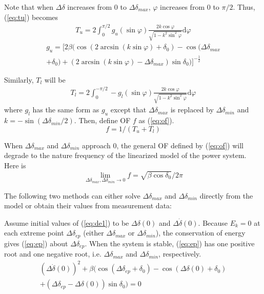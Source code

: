 \documentclass[journal]{IEEEtran}
\begin{document}
Note that when $\Delta\delta$ increases from 0 to $\Delta\delta_{max}$, $\varphi$ increases from 0 to $\pi/2$. Thus, (\ref{eq:tu}) becomes
\begin{eqnarray} \label{eq:tu2}
T_{u}=2\int_{0}^{\pi/2}g_{u}(\sin\varphi)\frac{2k\cos\varphi}{\sqrt{1-k^{2}\sin^{2}\varphi}}\textrm{d}\varphi
\end{eqnarray}
\begin{eqnarray} \label{eq:gu}
g_{u}=\bigl[2\beta\bigl(\cos(2\arcsin(k\sin\varphi)+\delta_{0})-\cos(\Delta\delta_{max}\nonumber\\
+\delta_{0})+(2\arcsin(k\sin\varphi)-\Delta\delta_{max})\sin\delta_{0}\bigl)\bigr]^{-\frac{1}{2}}
\end{eqnarray}

Similarly, $T_{l}$ will be
\begin{eqnarray} \label{eq:tl}
T_{l}=2\int_{0}^{-\pi/2}-g_{l}(\sin\varphi)\frac{2k\cos\varphi}{\sqrt{1-k^{2}\sin^{2}\varphi}}\textrm{d}\varphi
\end{eqnarray}
where $g_{l}$ has the same form as $g_{u}$ except that $\Delta\delta_{max}$ is replaced by $\Delta\delta_{min}$ and $k=-\sin(\Delta\delta_{min}/2)$. Then, define OF $f$ as (\ref{eq:of}).
\begin{equation} \label{eq:of}
f=1/(T_{u}+T_{l})
\end{equation}

When $\Delta\delta_{max}$ and $\Delta\delta_{min}$ approach 0, the general OF defined by (\ref{eq:of}) will degrade to the nature frequency of the linearized model of the power system. Here is
\begin{equation} \label{eq:lmtf}
\lim_{\Delta\delta_{max},\Delta\delta_{min} \to 0}f=\sqrt{\beta\cos \delta_{0}}/2\pi
\end{equation}

The following two methods can either solve $\Delta\delta_{max}$ and $\Delta\delta_{min}$ directly from the model or obtain their values from measurement data:

Assume initial values of (\ref{eq:de1}) to be $\Delta\delta(0)$ and $\Delta\dot{\delta}(0)$. Because $E_{k}=0$ at each extreme point $\Delta\delta_{ep}$ (either $\Delta\delta_{max}$ or $\Delta\delta_{min}$), the conservation of energy gives (\ref{eq:ep}) about $\Delta\delta_{ep}$. When the system is stable, (\ref{eq:ep}) has one positive root and one negative root, i.e. $\Delta\delta_{max}$ and $\Delta\delta_{min}$, respectively.
\begin{eqnarray} \label{eq:ep}
(\Delta\dot{\delta}(0))^{2}+\beta\bigr(\cos(\Delta\delta_{ep}+\delta_{0})-\cos(\Delta\delta(0)+\delta_{0})\nonumber\\
+(\Delta\delta_{ep}-\Delta\delta(0))\sin\delta_{0}\bigr)=0
\end{eqnarray}
\end{document}
